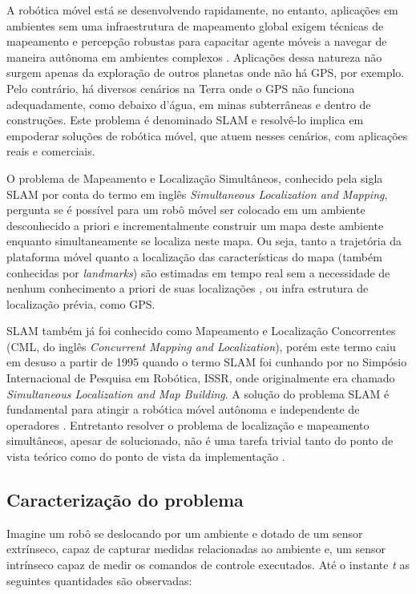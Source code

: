 
A robótica móvel está se desenvolvendo rapidamente, no entanto, aplicações 
em ambientes sem uma infraestrutura de mapeamento global exigem técnicas 
de mapeamento e percepção robustas para capacitar agente móveis a 
navegar de maneira autônoma em ambientes complexos \cite{saeedi2016multiple}. Aplicações dessa 
natureza não surgem apenas da exploração de outros planetas onde não há 
GPS, por exemplo. Pelo contrário, há diversos cenários na Terra onde o 
GPS não funciona adequadamente, como debaixo d'água, 
em minas subterrâneas e dentro de construções. Este problema é denominado SLAM e resolvê-lo implica em empoderar soluções de robótica móvel, 
que atuem nesses cenários, com aplicações reais e comerciais.

O problema de Mapeamento e Localização Simultâneos, conhecido pela sigla SLAM por conta do termo em inglês \textit{Simultaneous Localization and Mapping}, pergunta se é possível para um robô móvel ser colocado em um ambiente desconhecido a priori e incrementalmente construir um mapa deste ambiente enquanto simultaneamente se localiza neste mapa. Ou seja, tanto a trajetória da plataforma móvel quanto a localização das características do mapa (também conhecidas por \textit{landmarks}) são estimadas em tempo real sem a necessidade de nenhum conhecimento a priori de suas localizações \cite{durrant2006simultaneous}, ou infra estrutura de localização prévia, como GPS.

SLAM também já foi conhecido como Mapeamento e Localização Concorrentes (CML, do inglês \textit{Concurrent Mapping and Localization}), porém este termo caiu em desuso a partir de 1995 quando o termo SLAM foi cunhando por  no Simpósio Internacional de Pesquisa em Robótica, ISSR, onde originalmente era chamado \textit{Simultaneous Localization and Map Building}. A solução do problema SLAM é fundamental para atingir a robótica móvel autônoma e independente de operadores \cite{durrant2006simultaneous}. Entretanto resolver o problema de localização e mapeamento simultâneos, apesar de solucionado, não é uma tarefa trivial tanto do ponto de vista teórico como do ponto de vista da implementação \cite{durrant1996localization}.

\subsection*{Caracterização do problema}
Imagine um robô se deslocando por um ambiente e dotado de um sensor extrínseco, capaz de capturar medidas relacionadas ao 
ambiente e, um sensor intrínseco capaz de medir os comandos de 
controle executados. Até o instante \emph{t} as seguintes 
quantidades são observadas:

